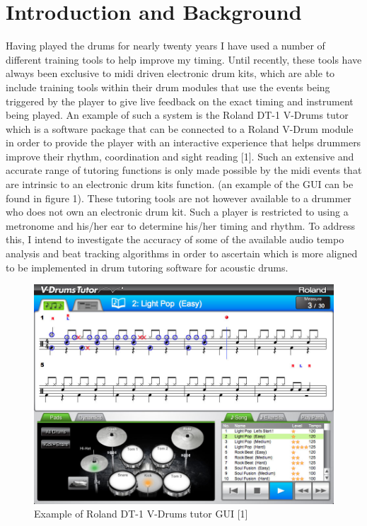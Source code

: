 \documentclass[a4paper, 11pt]{article}
\begin{document}
\maketitle{} \section{Introduction and Background}
Having played the drums for nearly twenty years I have used a number of different training tools to help improve my timing. Until recently, these tools have always been exclusive to midi driven electronic drum kits, which are able to include training tools within their drum modules that use the events being triggered by the player to give live feedback on the exact timing and instrument being played. An example of such a system is the Roland DT-1 V-Drums tutor which is a software package that can be connected to a Roland V-Drum module in order to provide the player with an interactive experience that helps drummers improve their rhythm, coordination and sight reading [1]. Such an extensive and accurate range of tutoring functions is only made possible by the midi events that are intrinsic to an electronic drum kits function. (an example of the GUI can be found in figure 1). These tutoring tools are not however available to a drummer who does not own an electronic drum kit. Such a player is restricted to using a metronome and his/her ear to determine his/her timing and rhythm. To address this, I intend to investigate the accuracy of some of the available audio tempo analysis and beat tracking algorithms in order to ascertain which is more aligned to be implemented in drum tutoring software for acoustic drums.
\begin{figure}[h]
\caption{Example of Roland DT-1 V-Drums tutor GUI [1]}
	\centering
	\includegraphics[scale=0.25]{dt-1_ss_main_notation_gal}
\end{figure}
\end{document}

